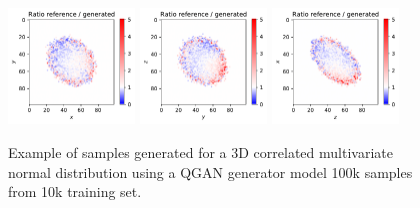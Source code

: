 \documentclass[twocolumn,preprintnumbers,superscriptaddress]{revtex4-2}
\begin{document}
\begin{figure}
  \includegraphics[width=0.3\textwidth]{plots/3Dgaussian_posdef/1-2_RATIO_100k.pdf}%
  \includegraphics[width=0.3\textwidth]{plots/3Dgaussian_posdef/2-3_RATIO_100k.pdf}%
  \includegraphics[width=0.3\textwidth]{plots/3Dgaussian_posdef/3-1_RATIO_100k.pdf}

  \caption{\label{fig:3dgauss}Example of samples generated for a 3D correlated
    multivariate normal distribution using a QGAN generator model 100k samples from 10k training set.}
\end{figure}
\end{document}
